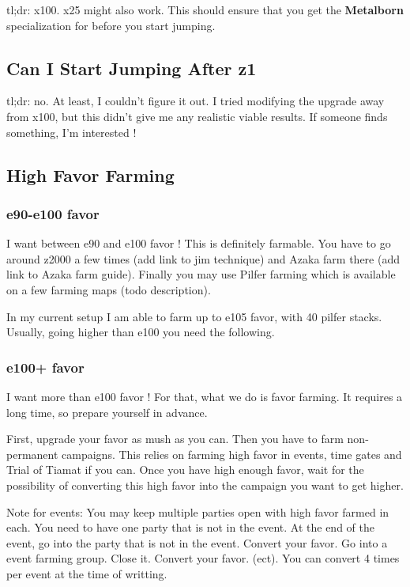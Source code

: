 \documentclass{article}
\begin{document}
tl;dr: x100.\newline
x25 might also work.
This should ensure that you get the \textbf{Metalborn} specialization for \briv before you start jumping.


\subsection{Can I Start Jumping After z1}

tl;dr: no.\newline
At least, I couldn't figure it out.
I tried modifying the upgrade away from x100, but this didn't give me any realistic viable results.
If someone finds something, I'm interested !


\subsection{High Favor Farming}

\subsubsection{e90-e100 favor}
I want between e90 and e100 favor !
This is definitely farmable.
You have to go around z2000 a few times (add link to jim technique) and Azaka farm there (add link to Azaka farm guide).
Finally you may use Pilfer farming which is available on a few farming maps (todo description).

In my current setup I am able to farm up to e105 favor, with 40 pilfer stacks.
Usually, going higher than e100 you need the following.

\subsubsection{e100+ favor}

I want more than e100 favor !
For that, what we do is favor farming.
It requires a long time, so prepare yourself in advance.

First, upgrade your favor as mush as you can.
Then you have to farm non-permanent campaigns.
This relies on farming high favor in events, time gates and Trial of Tiamat if you can.
Once you have high enough favor, wait for the possibility of converting this high favor into the campaign you want to get higher.

Note for events:
You may keep multiple parties open with high favor farmed in each.
You need to have one party that is not in the event.
At the end of the event, go into the party that is not in the event.
Convert your favor.
Go into a event farming group.
Close it.
Convert your favor.
(ect).
You can convert 4 times per event at the time of writting.
\end{document}
